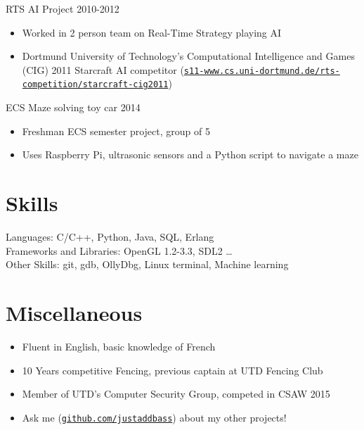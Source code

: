 \documentclass[line,margin]{res}
\begin{document}
\begin{resume}
\vspace{6pt}
RTS AI Project
\hfill 2010-2012
	\begin{itemize} \itemsep -2pt
	\item Worked in 2 person team on Real-Time Strategy playing AI
	\item Dortmund University of Technology’s Computational Intelligence and Games (CIG) 2011 Starcraft AI
        competitor (\href{https://www.s11-www.cs.uni-dortmund.de/rts-competition/starcraft-cig2011}{\texttt{s11-www.cs.uni-dortmund.de/rts-competition/starcraft-cig2011}})
	\end{itemize}


\vspace{6pt}
ECS Maze solving toy car
\hfill 2014
	\begin{itemize} \itemsep -2pt
	\item Freshman ECS semester project, group of 5
	\item Uses Raspberry Pi, ultrasonic sensors and a Python script to navigate a maze
	\end{itemize}

\vspace{8pt}
\section{Skills}
\vspace{12pt}
	Languages: C/C++, Python, Java, SQL, Erlang \\
	Frameworks and Libraries: OpenGL 1.2-3.3, SDL2 \ldots \\
	Other Skills: git, gdb, OllyDbg, Linux terminal, Machine learning

\vspace{8pt}
\section{Miscellaneous}
\vspace{22pt}
	\begin{itemize} \itemsep -2pt
	\item Fluent in English, basic knowledge of French
	\item 10 Years competitive Fencing, previous captain at UTD Fencing Club
	\item Member of UTD's Computer Security Group, competed in CSAW 2015
	\item Ask me (\href{https://github.com/justaddbass}{\texttt{github.com/justaddbass}}) about my other projects!
	\end{itemize}

\end{resume}
\end{document}
